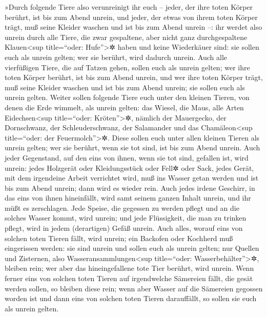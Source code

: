»Durch folgende Tiere also verunreinigt ihr euch --
jeder, der ihre toten Körper berührt, ist bis zum Abend unrein,
und jeder, der etwas von ihrem toten Körper trägt, muß
seine Kleider waschen und ist bis zum Abend unrein --:
ihr werdet also unrein durch alle Tiere, die zwar
gespaltene, aber nicht ganz durchgespaltene Klauen\textless sup
title=``oder: Hufe''\textgreater✲ haben und keine Wiederkäuer sind: sie
sollen euch als unrein gelten; wer sie berührt, wird dadurch unrein.
Auch alle vierfüßigen Tiere, die auf Tatzen gehen, sollen
euch als unrein gelten; wer ihre toten Körper berührt, ist bis zum Abend
unrein, und wer ihre toten Körper trägt, muß seine
Kleider waschen und ist bis zum Abend unrein; sie sollen euch als unrein
gelten. Weiter sollen folgende Tiere euch unter den
kleinen Tieren, von denen die Erde wimmelt, als unrein gelten: das
Wiesel, die Maus, alle Arten Eidechsen\textless sup title=``oder:
Kröten''\textgreater✲, nämlich der Mauergecko, der
Dornschwanz, der Schleuderschwanz, der Salamander und das
Chamäleon\textless sup title=``oder: der Feuermolch''\textgreater✲.
Diese sollen euch unter allen kleinen Tieren als unrein
gelten; wer sie berührt, wenn sie tot sind, ist bis zum Abend unrein.
Auch jeder Gegenstand, auf den eins von ihnen, wenn sie
tot sind, gefallen ist, wird unrein: jedes Holzgerät oder Kleidungsstück
oder Fell✲ oder Sack, jedes Gerät, mit dem irgendeine Arbeit verrichtet
wird, muß ins Wasser getan werden und ist bis zum Abend unrein; dann
wird es wieder rein. Auch jedes irdene Geschirr, in das
eins von ihnen hineinfällt, wird samt seinem ganzen Inhalt unrein, und
ihr müßt es zerschlagen. Jede Speise, die gegessen zu
werden pflegt und an die solches Wasser kommt, wird unrein; und jede
Flüssigkeit, die man zu trinken pflegt, wird in jedem (derartigen) Gefäß
unrein. Auch alles, worauf eins von solchen toten Tieren
fällt, wird unrein; ein Backofen oder Kochherd muß eingerissen werden:
sie sind unrein und sollen euch als unrein gelten; nur
Quellen und Zisternen, also Wasseransammlungen\textless sup
title=``oder: Wasserbehälter''\textgreater✲, bleiben rein; wer aber das
hineingefallene tote Tier berührt, wird unrein. Wenn
ferner eins von solchen toten Tieren auf irgendwelche Sämereien fällt,
die gesät werden sollen, so bleiben diese rein; wenn aber
Wasser auf die Sämereien gegossen worden ist und dann eins von solchen
toten Tieren darauffällt, so sollen sie euch als unrein gelten.


